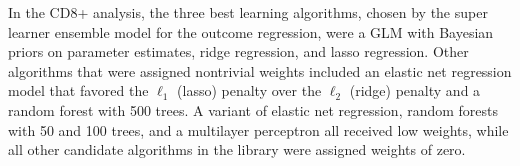 
In the CD8+ analysis, the three best learning algorithms, chosen by the super
learner ensemble model for the outcome regression, were a GLM with Bayesian
priors on parameter estimates, ridge regression, and lasso regression. Other
algorithms that were assigned nontrivial weights included an elastic net
regression model that favored the $\ell_1$ (lasso) penalty over the $\ell_2$
(ridge) penalty and a random forest with 500 trees. A variant of elastic net
regression, random forests with 50 and 100 trees, and a multilayer perceptron
all received low weights, while all other candidate algorithms in the library
were assigned weights of zero.

